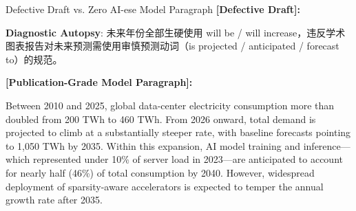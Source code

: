 \begin{ExampleBox}{Defective Draft vs. Zero AI-ese Model Paragraph}
\textbf{\color{TargetHighlight}[Defective Draft]:}\par
{}\par\vspace{4pt}
\textbf{Diagnostic Autopsy}: 未来年份全部生硬使用 will be / will increase，违反学术图表报告对未来预测需使用审慎预测动词（is projected / anticipated / forecast to）的规范。\par\vspace{6pt}
\textbf{\color{AcadNavy}[Publication-Grade Model Paragraph]:}\par
Between 2010 and 2025, global data-center electricity consumption more than doubled from 200 TWh to 460 TWh. From 2026 onward, total demand is projected to climb at a substantially steeper rate, with baseline forecasts pointing to 1,050 TWh by 2035. Within this expansion, AI model training and inference---which represented under 10\% of server load in 2023---are anticipated to account for nearly half (46\%) of total consumption by 2040. However, widespread deployment of sparsity-aware accelerators is expected to temper the annual growth rate after 2035.
\end{ExampleBox}
